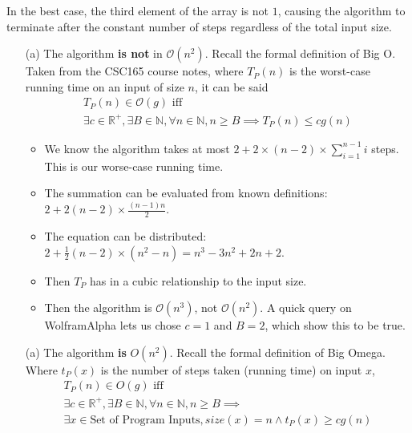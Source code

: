 \documentclass{article}
\begin{document}
\begin{enumerate}
    In the best case, the third element of the array is not $1$, causing the algorithm to terminate after the constant number of steps regardless of the total input size.
    \begin{enumerate}
    \item [(a)] The algorithm \textbf{is not} in $\mathcal{O}(n^2)$. Recall the formal definition of Big O. Taken from the CSC165 course notes, where $T_P(n)$ is the worst-case running time on an input of size $n$, it can be said
        \begin{gather*}
            T_P(n) \in \mathcal{O}(g) \text{ iff} \\
            \exists c \in \mathbb{R^+}, \exists B \in \mathbb{N}, \forall n \in \mathbb{N}, n \geq B \implies T_P(n) \leq cg(n)
        \end{gather*}
        \begin{itemize}
        \item We know the algorithm takes at most $2 + 2 \times (n - 2) \times \sum_{i = 1}^{n - 1} i$ steps. This is our worse-case running time.
        \item The summation can be evaluated from known definitions: $2 + 2 (n - 2) \times \frac{(n - 1) n}{2}$.
        \item The equation can be distributed: $2 + \frac{1}{2} (n - 2) \times (n^2 - n) = n^3 - 3n^2 + 2n + 2$.
        \item Then $T_P$ has in a cubic relationship to the input size.
        \item Then the algorithm is $\mathcal O(n^3)$, not $\mathcal O(n^2)$. A quick query on WolframAlpha lets us chose $c = 1$ and $B = 2$, which show this to be true.
        \end{itemize}
    \end{enumerate}
    \begin{enumerate}
    \item [(a)] The algorithm \textbf{is} $O(n^2)$. Recall the formal definition of Big Omega. Where $t_P(x)$ is the number of steps taken (running time) on input $x$,
        \begin{gather*}
            T_P(n) \in O(g) \text{ iff} \\
            \exists c \in \mathbb{R^+}, \exists B \in \mathbb{N}, \forall n \in \mathbb{N}, n \geq B \implies \\
            \exists x \in \text{Set of Program Inputs}, size(x) = n \land t_P(x) \geq cg(n)
        \end{gather*}
        \begin{itemize}

\end{itemize}
\end{enumerate}
\end{enumerate}
\end{document}
